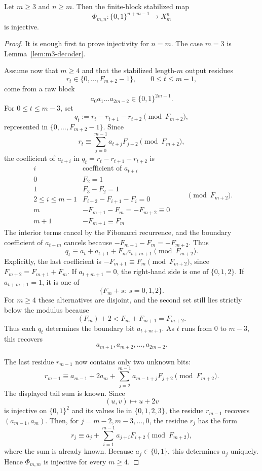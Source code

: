 \begin{theorem}\label{thm:block-invertibility}
Let $m\ge3$ and $n\ge m$.  Then the finite-block stabilized map
\[
\Phi_{m,n}:\{0,1\}^{n+m-1}\longrightarrow X_m^n
\]
is injective.
\end{theorem}

\begin{proof}
It is enough first to prove injectivity for $n=m$.  The case $m=3$ is
Lemma~\ref{lem:m3-decoder}.

Assume now that $m\ge4$ and that the stabilized length-$m$ output residues
\[
r_t\in\{0,\ldots,F_{m+2}-1\},\qquad 0\le t\le m-1,
\]
come from a raw block
\[
a_0a_1\ldots a_{2m-2}\in\{0,1\}^{2m-1}.
\]
For $0\le t\le m-3$, set
\[
q_t:=r_t-r_{t+1}-r_{t+2}\pmod {F_{m+2}},
\]
represented in $\{0,\ldots,F_{m+2}-1\}$.  Since
\[
r_t\equiv\sum_{j=0}^{m-1}a_{t+j}F_{j+2}\pmod {F_{m+2}},
\]
the coefficient of $a_{t+i}$ in $q_t=r_t-r_{t+1}-r_{t+2}$ is
\[
\begin{array}{c|c}
i & \text{coefficient of }a_{t+i}\\
\hline
0 & F_2=1\\
1 & F_3-F_2=1\\
2\le i\le m-1 & F_{i+2}-F_{i+1}-F_i=0\\
m & -F_{m+1}-F_m=-F_{m+2}\equiv0\\
m+1 & -F_{m+1}\equiv F_m
\end{array}
\qquad\pmod {F_{m+2}}.
\]
The interior terms cancel by the Fibonacci recurrence, and the boundary
coefficient of $a_{t+m}$ cancels because
$-F_{m+1}-F_m=-F_{m+2}$. Thus
\begin{equation}\label{eq:block-decoder-qt}
q_t\equiv a_t+a_{t+1}+F_m a_{t+m+1}\pmod {F_{m+2}}.
\end{equation}
Explicitly, the last coefficient is
$-F_{m+1}\equiv F_m\pmod {F_{m+2}}$, since
$F_{m+2}=F_{m+1}+F_m$.
If $a_{t+m+1}=0$, the right-hand side is one of $\{0,1,2\}$.  If
$a_{t+m+1}=1$, it is one of
\[
\{F_m+s:\ s=0,1,2\}.
\]
For $m\ge4$ these alternatives are disjoint, and the second set still lies
strictly below the modulus because
\[
(F_m)+2 < F_m+F_{m+1}=F_{m+2}.
\]
Thus each $q_t$ determines the boundary bit $a_{t+m+1}$.  As $t$ runs from
$0$ to $m-3$, this recovers
\[
a_{m+1},a_{m+2},\ldots,a_{2m-2}.
\]

The last residue $r_{m-1}$ now contains only two unknown bits:
\[
r_{m-1}\equiv
a_{m-1}+2a_m+\sum_{j=2}^{m-1}a_{m-1+j}F_{j+2}
\pmod {F_{m+2}}.
\]
The displayed tail sum is known.  Since
\[
(u,v)\mapsto u+2v
\]
is injective on $\{0,1\}^2$ and its values lie in $\{0,1,2,3\}$, the residue
$r_{m-1}$ recovers $(a_{m-1},a_m)$.  Then, for
$j=m-2,m-3,\ldots,0$, the residue $r_j$ has the form
\[
r_j\equiv a_j+\sum_{i=1}^{m-1}a_{j+i}F_{i+2}\pmod {F_{m+2}},
\]
where the sum is already known.  Because $a_j\in\{0,1\}$, this determines
$a_j$ uniquely.  Hence $\Phi_{m,m}$ is injective for every $m\ge4$.


\end{proof}
